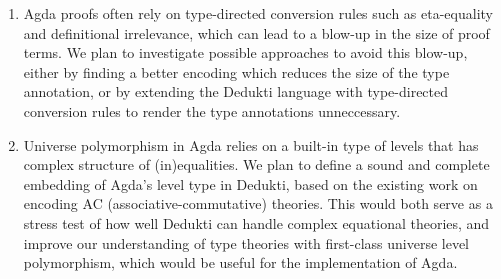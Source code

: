\begin{enumerate}
  \item Agda proofs often rely on type-directed conversion rules such
  as eta-equality and definitional irrelevance, which can lead to a
  blow-up in the size of proof terms. We plan to investigate possible
  approaches to avoid this blow-up, either by finding a better
  encoding which reduces the size of the type annotation, or by
  extending the Dedukti language with type-directed conversion rules
  to render the type annotations unneccessary.

  \item Universe polymorphism in Agda relies on a built-in type of
  levels that has complex structure of (in)equalities. We plan to
  define a sound and complete embedding of Agda’s level type in
  Dedukti, based on the existing work on encoding AC
  (associative-commutative) theories. This would both serve as a
  stress test of how well Dedukti can handle complex equational
  theories, and improve our understanding of type theories with
  first-class universe level polymorphism, which would be useful for
  the implementation of Agda.


\end{enumerate}

